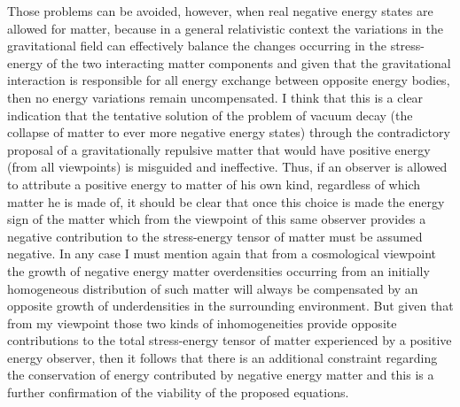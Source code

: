 \documentclass[notitlepage,12pt]{report}
\begin{document}
Those problems can be avoided, however, when real negative energy states are allowed for matter, because in a general relativistic context the variations in the gravitational field can effectively balance the changes occurring in the stress-energy of the two interacting matter components and given that the gravitational interaction is responsible for all energy exchange between opposite energy bodies, then no energy variations remain uncompensated. I think that this is a clear indication that the tentative solution of the problem of vacuum decay (the collapse of matter to ever more negative energy states) through the contradictory proposal of a gravitationally repulsive matter that would have positive energy (from all viewpoints) is misguided and ineffective. Thus, if an observer is allowed to attribute a positive energy to matter of his own kind, regardless of which matter he is made of, it should be clear that once this choice is made the energy sign of the matter which from the viewpoint of this same observer provides a negative contribution to the stress-energy tensor of matter must be assumed negative. In any case I must mention again that from a cosmological viewpoint the growth of negative energy matter overdensities occurring from an initially homogeneous distribution of such matter will always be compensated by an opposite growth of underdensities in the surrounding environment. But given that from my viewpoint those two kinds of inhomogeneities provide opposite contributions to the total stress-energy tensor of matter experienced by a positive energy observer, then it follows that there is an additional constraint regarding the conservation of energy contributed by negative energy matter and this is a further confirmation of the viability of the proposed equations.
\end{document}
